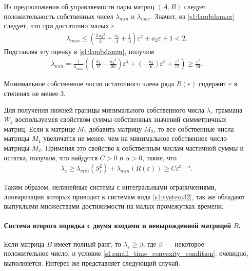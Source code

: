 \documentclass[../main.tex]{subfiles}
\begin{document}
Из предположения об управляемости пары матриц $ (A,B) $ следует положительность собственных чисел $ \lambda_{min} $ и $ \lambda_{max} $.
Значит, из \eqref{s1:lambdamax} следует, что при достаточно малых $\varepsilon$
\begin{gather*}
    \lambda_{max} \leqslant \left(\frac{2\,{a_{2}}^2}{3}+\frac{a_{1}}{3}+\frac{1}{3}\right)\varepsilon^2+a_{2}\varepsilon+1 < 2.
\end{gather*}
Подставляя эту оценку в \eqref{s1:lambdamin}, получим
\begin{gather*}
     \lambda_{min} = \frac{1}{\lambda_{max}}\left(  \left(\frac{a_{1}}{9}-\frac{{a_{2}}^2}{36}\right)\varepsilon^4+\left(-\frac{a_{2}}{6}\right)\varepsilon^3+\frac{\varepsilon^2}{12}\right) \geqslant\frac{\varepsilon^2}{24}.
\end{gather*}
 
Минимальное собственное число остаточного члена ряда $ R(\varepsilon) $ содержит $ \varepsilon $ в степенях не менее 3.
 
Для получения нижней границы минимального собственного числа $ \lambda_{\varepsilon} $ грамиана $ W_{\varepsilon}$ воспользуемся свойством суммы собственных значений симметричных матриц\cite{Wilkinson}.
Если к матрице $ M_1 $ добавить матрицу $ M_2 $, то все собственные числа матрицы $ M_1 $ увеличатся не менее, чем на минимальное собственное число матрицы $ M_2 $.
Применяя это свойство к собственным числам частичной суммы и остатка, получим, что найдутся $C > 0$ и $\alpha > 0 $, такие, что
\begin{gather*}
    \lambda_{\varepsilon} \geqslant \lambda_{min}(S_{\varepsilon}^{2}) + \lambda_{min}(R(\varepsilon)) \geqslant  C \varepsilon^{3-\alpha}.
\end{gather*}
 
Таким образом, нелинейные системы с интегральными ограничениями, линеаризация которых приводит к системам вида \eqref{s1:system32},  так же обладают выпуклыми множествами достижимости на малых промежутках времени.

\paragraph{Система второго порядка с двумя входами и невырожденной матрицей $B$.}
Если матрица $ B $ имеет полный ранг, то $\lambda_{\varepsilon} \geqslant \beta $, где $ \beta $~--- некоторое положительное число, и условие \eqref{s1:small_time_convexity_condition}, очевидно, выполняется.
Интерес же представляет следующий случай.
\end{document}
